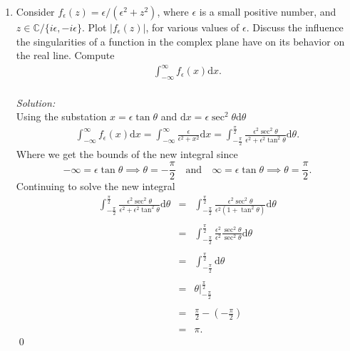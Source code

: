 \documentclass[10pt]{amsart}
\newcommand{\D}{\mathrm{d}}
\theoremstyle{nonumberplain}
\begin{document}
\begin{enumerate}[label={\bf {\arabic*}:}]
\item Consider $f_\epsilon(z)=\epsilon /\left(\epsilon^2+z^2\right)$, where
  $\epsilon$ is a small positive number, and $z \in \mathbb{C} /\{i
  \epsilon,-i \epsilon\}$. Plot $\left|f_\epsilon(z)\right|$, for various
  values of $\epsilon$. Discuss the influence the singularities of a
  function in the complex plane have on its behavior on the real
  line. Compute
  \begin{align*}
    \int_{-\infty}^\infty f_\epsilon(x) \D x.
  \end{align*} \\
\textit{Solution:} \\
Using the substation $x = \epsilon \tan \theta$ and $\D x = \epsilon \sec^2 \theta \D \theta$
\begin{eqnarray*}
\int_{-\infty}^\infty f_\epsilon(x) \D x = \int_{-\infty}^\infty \frac{\epsilon} {\epsilon^2+x^2} \D x = \int_{-\frac{\pi}{2}}^{\frac{\pi}{2}} \frac{\epsilon^2 \sec^2 \theta} {\epsilon^2 + \epsilon^2 \tan^2\theta}  \D \theta.
\end{eqnarray*}
Where we get the bounds of the new integral since $$-\infty = \epsilon \tan \theta \implies \theta = -\frac{\pi}{2} \quad \text{and} \quad \infty = \epsilon \tan \theta \implies \theta = \frac{\pi}{2}.$$
Continuing to solve the new integral
\begin{eqnarray*}
\int_{-\frac{\pi}{2}}^{\frac{\pi}{2}} \frac{\epsilon^2 \sec^2 \theta} {\epsilon^2 + \epsilon^2 \tan^2\theta}  \D \theta &=& \int_{-\frac{\pi}{2}}^{\frac{\pi}{2}} \frac{\epsilon^2 \sec^2 \theta} {\epsilon^2 \left(1 + \tan^2\theta\right)}  \D \theta \\ \\
&=& \int_{-\frac{\pi}{2}}^{\frac{\pi}{2}} \frac{\epsilon^2 }{\epsilon^2 }\frac{\sec^2 \theta} {\sec^2 \theta}  \D \theta \\ \\
&=& \int_{-\frac{\pi}{2}}^{\frac{\pi}{2}} \D \theta \\ \\
&=& \left. \theta \right|_{-\frac{\pi}{2}}^{\frac{\pi}{2}} \\ \\
&=& \frac{\pi}{2} - \left(-\frac{\pi}{2}\right) \\ \\
&=& \pi.
\end{eqnarray*}
\qed \\


\end{enumerate}
\end{document}
